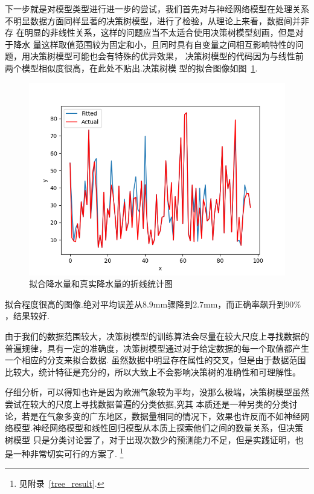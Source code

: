 \documentclass[UTF8, a4paper]{ctexart}
\begin{document}
下一步就是对模型类型进行进一步的尝试，我们首先对与神经网络模型在处理关系
不明显数据方面同样显著的决策树模型，进行了检验，从理论上来看，数据间并非存
在明显的非线性关系，这样的问题应当不太适合使用决策树模型刻画，但是对于降水
量这样取值范围较为固定和小，且同时具有自变量之间相互影响特性的问题，用决策树模型可能也会有特殊的优异效果，
决策树模型的代码因为与线性前两个模型相似度很高，在此处不贴出.决策树模
型的拟合图像如图~\textcolor{red}{\ref{pic10}}.

\begin{figure}[h!]
	\centering
	\includegraphics[scale=0.3]{very_success.png}
	\caption{拟合降水量和真实降水量的折线统计图}\label{pic10}
\end{figure}

拟合程度很高的图像.绝对平均误差从$8.9$\si{\milli\meter}骤降到$2.7$\si{\milli\meter}，而正确率飙升到$90\%$，结果较好.

由于我们的数据范围较大，决策树模型的训练算法会尽量在较大尺度上寻找数据的普遍规律，具有一定的准确度，决策树模型通过对于给定数据的每一个取值都产生一个相应的分支来拟合数据.
虽然数据中明显存在属性的交叉，但是由于数据范围比较大，统计特征是充分的，所以大致上不会影响决策树的准确性和可理解性。

仔细分析，可以得知也许是因为欧洲气象较为平均，没那么极端，决策树模型虽然尝试在较大的尺度上寻找数据普遍的分类依据,究其
本质还是一种另类的分类讨论，若是在气象多变的广东地区，数据量相同的情况下，效果也许反而不如神经网
络模型.神经网络模型和线性回归模型从本质上探索他们之间的数量关系，但决策树模型
只是分类讨论罢了，对于出现次数少的预测能力不足，但是实践证明，也是一种非常切实可行的方案了.
\footnote{见附录~\textcolor{red}{\ref{tree_result}}.}
\end{document}
